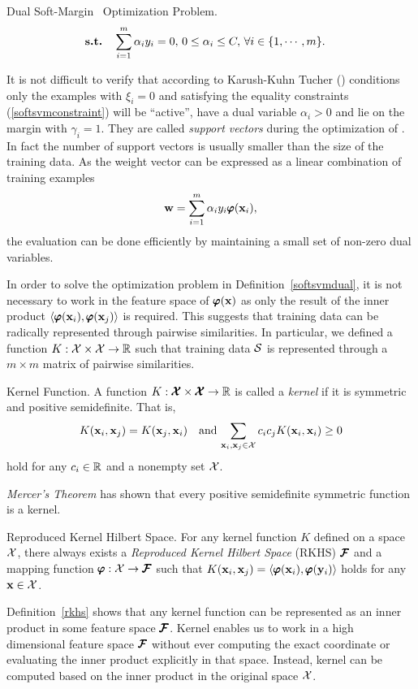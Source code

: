 {\begin{definition}{Dual Soft-Margin \svm\ Optimization Problem.}
\begin{align*}
		\textbf{s.t.} & \quad \sum_{i=1}^{m}\alpha_iy_i=0, \, 0\le\alpha_i\le C, \, \forall i\in\{1,\cdots,m\}.
	\end{align*}
\end{definition}
\noindent
It is not difficult to verify that according to Karush-Kuhn Tucher (\kkt) conditions only the examples with $\xi_i=0$ and satisfying the equality constraints (\ref{softsvmconstraint}) will be ``active'', have a dual variable $\alpha_i>0$ and lie on the margin with $\gamma_i=1$.
They are called \textit{support vectors} during the optimization of \svm.
In fact the number of support vectors is usually smaller than the size of the training data.
As the weight vector can be expressed as a linear combination of training examples \citep{taylor04}
\begin{align*}
	\mathbf {w} = \sum_{i=1}^{m}\alpha_iy_i\pmb \varphi(\mathbf {x}_i),
\end{align*}
the evaluation can be done efficiently by maintaining a small set of non-zero dual variables.

In order to solve the optimization problem in Definition~\ref{softsvmdual}, it is not necessary to work in the feature space of $\pmb \varphi(\mathbf {x})$ as only the result of the inner product $\langle \pmb \varphi(\mathbf {x}_i), \pmb \varphi(\mathbf {x}_j) \rangle$ is required.
This suggests that training data can be radically represented through pairwise similarities.
In particular, we defined a function $K:\mathcal{X}\times\mathcal{X}\rightarrow\mathbb{R}$ such that training data $\mathcal{S}$ is represented through a $m\times m$ matrix of pairwise similarities.
\begin{definition}{Kernel Function.}
 	A function $K:\pmb {\mathcal{X}}\times\pmb {\mathcal{X}}\rightarrow\mathbb{R}$ is called a \textit{kernel} if it is symmetric and positive semidefinite. That is, 
\begin{align*}
	K(\mathbf {x}_i,\mathbf {x}_j) = K(\mathbf {x}_j,\mathbf {x}_i)\quad \text{and}\, \sum_{\mathbf {x}_i,\mathbf {x}_j\in\mathcal{X}}c_ic_jK(\mathbf {x}_i,\mathbf {x}_i)\ge0
\end{align*}
hold for any $c_i\in\mathbb{R}$ and a nonempty set $\mathcal{X}$.
\end{definition}
\noindent
\textit{Mercer's Theorem} \citep{taylor04} has shown that every positive semidefinite symmetric function is a kernel.
\begin{definition}{Reproduced Kernel Hilbert Space.} \label{rkhs}
	For any kernel function $K$ defined on a space $\mathcal{X}$, there always exists a \textit{Reproduced Kernel Hilbert Space} (RKHS) $\pmb {\mathcal{F}}$ and a mapping function $\pmb \varphi:\mathcal{X}\rightarrow\pmb {\mathcal{F}}$ such that $K(\mathbf {x}_i,\mathbf {x}_j)=\langle \pmb \varphi(\mathbf {x}_i), \pmb \varphi(\mathbf {y}_i) \rangle$ holds for any $\mathbf {x}\in\mathcal{X}$.
\end{definition}
\noindent
Definition~\ref{rkhs} shows that any kernel function can be represented as an inner product in some feature space $\pmb {\mathcal{F}}$.
Kernel enables us to work in a high dimensional feature space $\pmb {\mathcal{F}}$ without ever computing the exact coordinate or evaluating the inner product explicitly in that space.
Instead, kernel can be computed based on the inner product in the original space $\mathcal{X}$.

}

